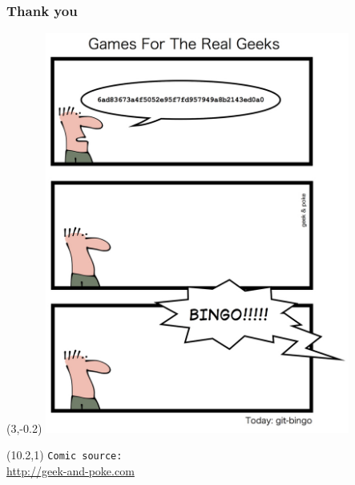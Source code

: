 \documentclass{gittalk}
\begin{document}
\begin{frame}
\frametitle{Thank you}
\begin{textblock}{10}(3,-0.2)
  \includegraphics[width=0.75\textwidth]{./img/git-bingo.jpg}
\end{textblock}
\begin{textblock}{6}(10.2,1)
  \footnotesize
  \texttt{Comic source:}\\
  \url{http://geek-and-poke.com}
\end{textblock}
\end{frame}

\end{document}
